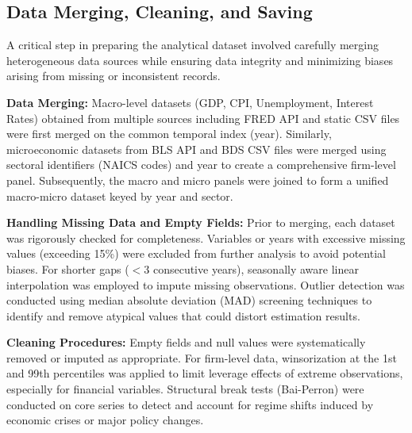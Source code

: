 \subsection{Data Merging, Cleaning, and Saving}

A critical step in preparing the analytical dataset involved carefully merging heterogeneous data sources while ensuring data integrity and minimizing biases arising from missing or inconsistent records.

\textbf{Data Merging:} Macro-level datasets (GDP, CPI, Unemployment, Interest Rates) obtained from multiple sources including FRED API and static CSV files were first merged on the common temporal index (year). Similarly, microeconomic datasets from BLS API and BDS CSV files were merged using sectoral identifiers (NAICS codes) and year to create a comprehensive firm-level panel. Subsequently, the macro and micro panels were joined to form a unified macro-micro dataset keyed by year and sector.

\textbf{Handling Missing Data and Empty Fields:} Prior to merging, each dataset was rigorously checked for completeness. Variables or years with excessive missing values (exceeding 15\%) were excluded from further analysis to avoid potential biases. For shorter gaps (\(<3\) consecutive years), seasonally aware linear interpolation was employed to impute missing observations. Outlier detection was conducted using median absolute deviation (MAD) screening techniques to identify and remove atypical values that could distort estimation results.

\textbf{Cleaning Procedures:} Empty fields and null values were systematically removed or imputed as appropriate. For firm-level data, winsorization at the 1st and 99th percentiles was applied to limit leverage effects of extreme observations, especially for financial variables. Structural break tests (Bai-Perron) were conducted on core series to detect and account for regime shifts induced by economic crises or major policy changes.

